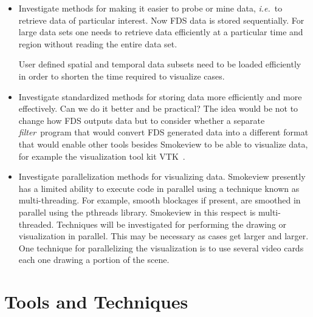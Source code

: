 \documentclass[11pt,twoside]{book}
\begin{document}
\begin{itemize}
\item Investigate methods for making it easier to probe or mine
data, {\em i.e.}\ to retrieve data of particular interest.  Now
FDS data is stored sequentially.  For large data sets one needs to
retrieve data efficiently at a particular time and region without
reading the entire data set.

User defined spatial and temporal data subsets need to be loaded
efficiently in order to shorten the time required to visualize
cases.

\item Investigate standardized methods for storing data more
efficiently and more effectively.  Can we do it better and be
practical?  The idea would be not to change how FDS outputs data
but to consider whether a separate {\em filter}\ program that
would convert FDS generated data into a different format that
would enable other tools besides Smokeview to be able to visualize
data, for example the visualization tool kit VTK~\cite{VTK}.

\item Investigate parallelization methods for visualizing data.
Smokeview presently has a limited ability to execute code in
parallel using a technique known as multi-threading.    For
example, smooth blockages if present, are smoothed in parallel
using the pthreads library. Smokeview in this respect is
multi-threaded.  Techniques will be investigated for performing
the drawing or visualization in parallel.  This may be necessary
as cases get larger and larger.  One technique for parallelizing
the visualization is to use several video cards each one drawing a
portion of the scene.
\end{itemize}

%
%

\section{Tools and Techniques}
\end{document}
